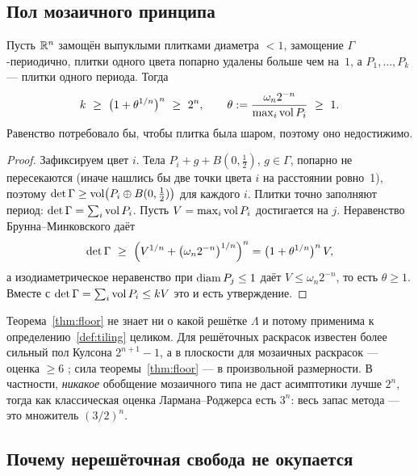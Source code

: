 \subsection{Пол мозаичного принципа}
\label{ssec:floor}

\begin{keybox}
\begin{theorem}[пол $2^n$]\label{thm:floor}
Пусть $\mathbb{R}^n$ замощён выпуклыми плитками диаметра $<1$, замощение
$\Gamma$-периодично, плитки одного цвета попарно удалены больше чем на~$1$, а
$P_1,\dots,P_k$ --- плитки одного периода. Тогда
\[
k\ \ge\ \bigl(1+\theta^{1/n}\bigr)^n\ \ge\ 2^n,
\qquad
\theta:=\frac{\omega_n2^{-n}}{\max_i\vol P_i}\ \ge\ 1 .
\]
Равенство потребовало бы, чтобы плитка была шаром, поэтому оно недостижимо.
\end{theorem}
\end{keybox}

\begin{proof}
Зафиксируем цвет $i$. Тела $P_i+g+B(0,\tfrac12)$, $g\in\Gamma$, попарно не
пересекаются (иначе нашлись бы две точки цвета $i$ на расстоянии ровно~1),
поэтому $\det\Gamma\ge\operatorname{vol}\bigl(P_i\oplus B(0,\tfrac12)\bigr)$ для каждого $i$.
Плитки точно заполняют период: $\det\Gamma=\sum_i\operatorname{vol} P_i$. Пусть
$V=\max_i\operatorname{vol} P_i$ достигается на $j$. Неравенство Брунна--Минковского даёт
\[
\det\Gamma\ \ge\ \Bigl(V^{1/n}+\bigl(\omega_n2^{-n}\bigr)^{1/n}\Bigr)^{n}
= \bigl(1+\theta^{1/n}\bigr)^{n}\,V,
\]
а изодиаметрическое неравенство при $\operatorname{diam} P_j\le1$ даёт
$V\le\omega_n2^{-n}$, то есть $\theta\ge1$. Вместе с
$\det\Gamma=\sum_i\operatorname{vol} P_i\le kV$ это и есть утверждение.
\end{proof}

Теорема~\ref{thm:floor} не знает ни о какой решётке $\Lambda$ и потому
применима к определению~\ref{def:tiling} целиком. Для решёточных раскрасок
известен более сильный пол Кулсона $2^{n+1}-1$, а в плоскости для мозаичных
раскрасок --- оценка $\ge6$ \cite{Coulson2004}; сила теоремы~\ref{thm:floor}
--- в произвольной размерности. В частности, \emph{никакое} обобщение
мозаичного типа не даст асимптотики лучше $2^n$, тогда как классическая
оценка Лармана--Роджерса есть $3^n$: весь запас метода --- это множитель
$(3/2)^n$.

\subsection{Почему нерешёточная свобода не окупается}
\label{ssec:whynot}

